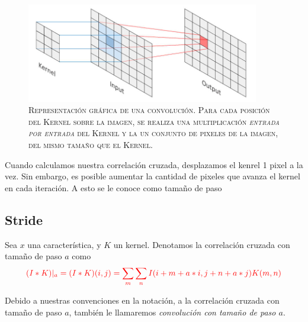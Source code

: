  \begin{figure}[H]
     \centering
     \includegraphics[width=4in]{../src/ch1convolution.jpg}
     \caption{\textsc{Representación gráfica de una convolución. Para cada posición del Kernel sobre la imagen, se realiza una multiplicación \textsl{entrada por entrada} del Kernel y la un conjunto de pixeles de la imagen, del mismo tamaño que el Kernel.}} 
 \end{figure}
 Cuando calculamos nuestra correlación cruzada, desplazamos el kenrel 1 pixel a la vez. Sin embargo, es posible aumentar la cantidad de pixeles que avanza el kernel en cada iteración. A esto se le conoce como tamaño de paso
 \subsection{Stride}
 \begin{definition}
    Sea $x$ una característica, y $K$ un kernel. Denotamos la correlación cruzada con tamaño de paso $a$ como 
    \begin{equation}
        \textcolor{red}{(I*K)|_a = (I*K)(i,j) = \sum_m\sum_n I(i+m+a*i,j+n+a*j)K(m,n)}
    \end{equation}
 \end{definition}
 Debido a nuestras convenciones en la notación, a la correlación cruzada con tamaño de paso $a$, también le llamaremos \textsl{convolución con tamaño de paso $a$}.
